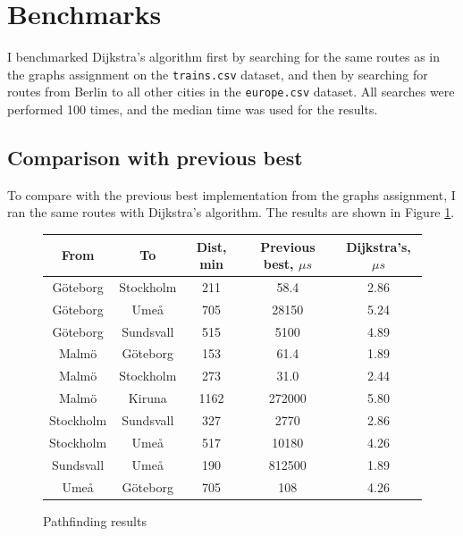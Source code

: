 \documentclass[a4paper,11pt]{article}
\begin{document}
    \section*{Benchmarks}

    I benchmarked Dijkstra's algorithm first by searching for the same routes as in the graphs assignment on the \texttt{trains.csv} dataset, and then by searching for routes from Berlin to all other cities in the \texttt{europe.csv} dataset. All searches were performed 100 times, and the median time was used for the results.
    
    \subsection*{Comparison with previous best}

    To compare with the previous best implementation from the graphs assignment, I ran the same routes with Dijkstra's algorithm. The results are shown in Figure \ref{fig:pathfinding}.
    
    \begin{figure}[H]
        \centering
        
        \hspace*{-9.5pt}\begin{tabular}{c|c|c|c|c}
            \textbf{From} & \textbf{To} & \textbf{Dist, min} & \textbf{Previous best, $\mu s$} & \textbf{Dijkstra's, $\mu s$} \\
            \hline
            \hline
            Göteborg & Stockholm & 211 & 58.4 & 2.86 \\
            Göteborg & Umeå & 705 & 28150 & 5.24 \\
            Göteborg & Sundsvall & 515 & 5100 & 4.89   \\
            Malmö & Göteborg & 153 & 61.4 & 1.89 \\
            Malmö & Stockholm & 273 & 31.0 & 2.44 \\
            Malmö & Kiruna & 1162 & 272000 & 5.80 \\
            Stockholm & Sundsvall & 327 & 2770 & 2.86 \\
            Stockholm & Umeå & 517 & 10180 & 4.26 \\
            Sundsvall & Umeå & 190 & 812500 & 1.89 \\
            Umeå & Göteborg & 705 & 108 & 4.26 \\
        \end{tabular}
        \caption{Pathfinding results}
        \label{fig:pathfinding}
    \end{figure}
\end{document}

